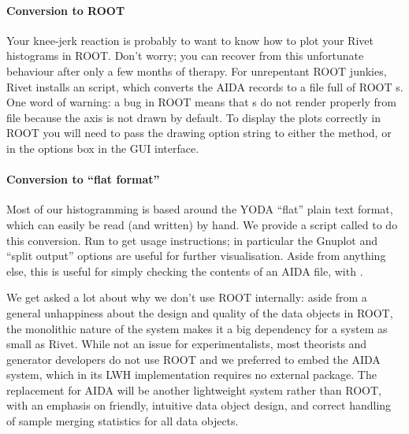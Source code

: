 \documentclass{JHEP3}
\begin{document}
\paragraph{Conversion to ROOT}

Your knee-jerk reaction is probably to want to know how to plot your Rivet
histograms in ROOT. Don't worry; you can recover from this unfortunate behaviour
after only a few months of therapy. For unrepentant ROOT junkies, Rivet installs
an  script, which converts the AIDA records to a  file
full of ROOT s. One word of warning: a bug in ROOT means that
s do not render properly from file because the axis is not drawn by
default. To display the plots correctly in ROOT you will need to pass the
 drawing option string to either the  method, or
in the options box in the  GUI interface.

\paragraph{Conversion to ``flat format''}

Most of our histogramming is based around the YODA ``flat'' plain text format,
which can easily be read (and written) by hand. We provide a script called
 to do this conversion. Run  to get usage
instructions; in particular the Gnuplot and ``split output'' options are useful
for further visualisation. Aside from anything else, this is useful for simply
checking the contents of an AIDA file, with .

\vspace{1.8em}

\begin{detail}
  We get asked a lot about why we don't use ROOT internally: aside from a
  general unhappiness about the design and quality of the data objects in ROOT,
  the monolithic nature of the system makes it a big dependency for a system as
  small as Rivet. While not an issue for experimentalists, most theorists and
  generator developers do not use ROOT and we preferred to embed the AIDA
  system, which in its LWH implementation requires no external package. The
  replacement for AIDA will be another lightweight system rather than ROOT, with
  an emphasis on friendly, intuitive data object design, and correct handling of
  sample merging statistics for all data objects.
\end{detail}
\end{document}
